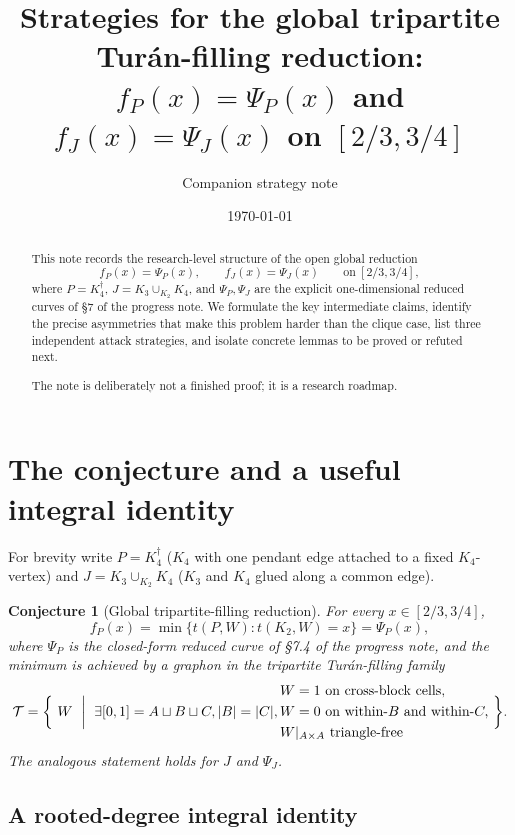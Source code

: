 \documentclass[11pt]{amsart}
\title[Strategies for the global tripartite-filling reduction]%
{Strategies for the global tripartite Turán-filling reduction:\\
$f_P(x)=\Psi_P(x)$ and $f_J(x)=\Psi_J(x)$ on $[2/3, 3/4]$}
\author{Companion strategy note}
\date{\today}
\newtheorem{conjecture}[theorem]{Conjecture}
\theoremstyle{definition}
\begin{document}
\maketitle

\begin{abstract}
This note records the research-level structure of the open global reduction
\[
   f_P(x) = \Psi_P(x),\qquad f_J(x) = \Psi_J(x)\qquad\text{on}\ [2/3,3/4],
\]
where $P = K_4^{\dagger}$, $J = K_3\cup_{K_2}K_4$, and $\Psi_P,\Psi_J$ are the
explicit one-dimensional reduced curves of §7 of the progress note.  We
formulate the key intermediate claims, identify the precise asymmetries that
make this problem harder than the clique case, list three independent attack
strategies, and isolate concrete lemmas to be proved or refuted next.

The note is deliberately not a finished proof; it is a research roadmap.
\end{abstract}

\tableofcontents

\section{The conjecture and a useful integral identity}

For brevity write $P = K_4^{\dagger}$ ($K_4$ with one pendant edge attached to
a fixed $K_4$-vertex) and $J = K_3\cup_{K_2}K_4$ ($K_3$ and $K_4$ glued
along a common edge).

\begin{conjecture}[Global tripartite-filling reduction]
\label{conj:global-reduction}
For every $x\in[2/3,3/4]$,
\[
   f_P(x) = \min\{t(P,W): t(K_2,W)=x\} = \Psi_P(x),
\]
where $\Psi_P$ is the closed-form reduced curve of §7.4 of the progress note,
and the minimum is achieved by a graphon in the tripartite Turán-filling
family
\[
   \mathcal T = \biggl\{\ W\ \biggm|\ \exists [0,1] = A\sqcup B\sqcup C, |B|=|C|,
   \begin{aligned}
   &W=1\ \text{on cross-block cells},\\
   &W=0\ \text{on within-}B\text{ and within-}C,\\
   &W|_{A\times A}\ \text{triangle-free}
   \end{aligned}\ \biggr\}.
\]
The analogous statement holds for $J$ and $\Psi_J$.
\end{conjecture}

\subsection{A rooted-degree integral identity}
\end{document}
